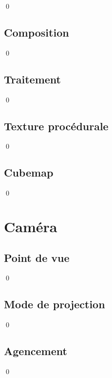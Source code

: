 \documentclass[12pt]{article}
\newcommand{\state}{\noindent}
\begin{document}
\state

\qed

\subsection{Composition}

\state

\qed

\subsection{Traitement}

\state

\qed

\subsection{Texture procédurale}

\state

\qed

\subsection{Cubemap}

\state

\qed

\pagebreak

\section{Caméra}

\subsection{Point de vue}

\state

\qed

\subsection{Mode de projection}

\state

\qed

\subsection{Agencement}

\state

\qed
\end{document}
